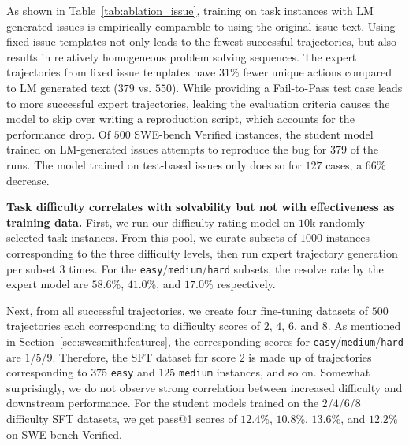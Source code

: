 As shown in Table~\ref{tab:ablation_issue}, training on task instances with LM generated issues is empirically comparable to using the original issue text.
Using fixed issue templates not only leads to the fewest successful trajectories, but also results in relatively homogeneous problem solving sequences.
The expert trajectories from fixed issue templates have $31$\% fewer unique actions compared to LM generated text ($379$ vs. $550$).
While providing a Fail-to-Pass test case leads to more successful expert trajectories, leaking the evaluation criteria causes the model to skip over writing a reproduction script, which accounts for the performance drop.
Of $500$ SWE-bench Verified instances, the student model trained on LM-generated issues attempts to reproduce the bug for $379$ of the runs.
The model trained on test-based issues only does so for $127$ cases, a $66$\% decrease.

\begin{table}[t]
\centering
\begin{minipage}[t]{0.52\textwidth}
    
\end{minipage}
\hfill
\begin{minipage}[t]{0.45\textwidth}
    
\end{minipage}
\end{table}

\textbf{Task difficulty correlates with solvability but not with effectiveness as training data.}
First, we run our difficulty rating model on $10$k randomly selected \bugs{} task instances.
From this pool, we curate subsets of $1000$ instances corresponding to the three difficulty levels, then run expert trajectory generation per subset $3$ times.
For the \texttt{easy}/\texttt{medium}/\texttt{hard} subsets, the resolve rate by the expert model are $58.6$\%, $41.0$\%, and $17.0$\% respectively.

Next, from all successful trajectories, we create four fine-tuning datasets of $500$ trajectories each corresponding to difficulty scores of $2$, $4$, $6$, and $8$.
As mentioned in Section~\ref{sec:swesmith:features}, the corresponding scores for \texttt{easy}/\texttt{medium}/\texttt{hard} are $1$/$5$/$9$.
Therefore, the SFT dataset for score $2$ is made up of trajectories corresponding to $375$ \texttt{easy} and $125$ \texttt{medium} instances, and so on.
Somewhat surprisingly, we do not observe strong correlation between increased difficulty and downstream performance.
For the student models trained on the $2$/$4$/$6$/$8$ difficulty SFT datasets, we get pass@1 scores of $12.4$\%, $10.8$\%, $13.6$\%, and $12.2$\% on SWE-bench Verified.

